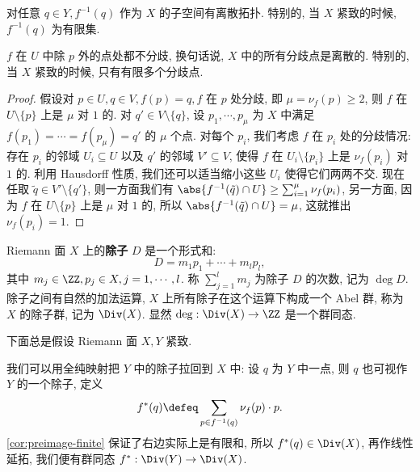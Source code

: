 \begin{cor}
\label{cor:preimage-finite}
对任意 $q \in Y, f^{-1}(q)$ 作为 $X$ 的子空间有离散拓扑.
特别的, 当 $X$ 紧致的时候, $f^{-1}(q)$ 为有限集.
\end{cor}

\begin{prop}
\label{prop:ramification-point-finite}
$f$ 在 $U$ 中除 $p$ 外的点处都不分歧,
换句话说, $X$ 中的所有分歧点是离散的.
特别的, 当 $X$ 紧致的时候, 只有有限多个分歧点.
\end{prop}

\begin{proof}
假设对 $p \in U, q \in V, f(p) = q, f$ 在 $p$ 处分歧,
即 $\mu = \nu_f(p) \ge 2$, 则 $f$ 在 $U\setminus \{p\}$ 上是 $\mu$ 对 $1$ 的.
对 $q' \in V\setminus \{q\}$,
设 $p_1,\cdots, p_\mu$ 为 $X$ 中满足 $f(p_1) = \cdots = f(p_\mu) = q'$ 的 $\mu$ 个点.
对每个 $p_i$, 我们考虑 $f$ 在 $p_i$ 处的分歧情况:
存在 $p_i$ 的邻域 $U_i \subseteq U$ 以及 $q'$ 的邻域 $V' \subseteq V$,
使得 $f$ 在 $U_i\setminus \{p_i\}$ 上是 $\nu_f(p_i)$ 对 $1$ 的.
利用 Hausdorff 性质, 我们还可以适当缩小这些 $U_i$ 使得它们两两不交.
现在任取 $\tilde{q} \in V'\setminus \{q'\}$,
则一方面我们有 $\abs{f^{-1}(\tilde{q})\cap U} \ge \sum_{i=1}^\mu \nu_f(p_i)$,
另一方面, 因为 $f$ 在 $U\setminus \{p\}$ 上是 $\mu$ 对 $1$ 的,
所以 $\abs{f^{-1}(\tilde{q})\cap U} = \mu$,
这就推出 $\nu_f(p_i) = 1$.
\end{proof}

\begin{defin}[除子]
\label{defin:divisor}
Riemann 面 $X$ 上的\textbf{除子} $D$ 是一个形式和:
\[D = m_1p_1 + \cdots + m_lp_l,\]
其中 $m_j \in \ZZ, p_j \in X, j = 1,\cdots, l$.
称 $\sum_{j=1}^l m_j$ 为除子 $D$ 的次数, 记为 $\deg D$.
除子之间有自然的加法运算,
$X$ 上所有除子在这个运算下构成一个 Abel 群,
称为 $X$ 的除子群, 记为 $\Div(X)$.
显然 $\deg: \Div(X) \to \ZZ$ 是一个群同态.
\end{defin}

下面总是假设 Riemann 面 $X, Y$ 紧致.

\begin{exmp}[除子的拉回]
\label{exmp:divisor-pullback}
我们可以用全纯映射把 $Y$ 中的除子拉回到 $X$ 中:
设 $q$ 为 $Y$ 中一点, 则 $q$ 也可视作 $Y$ 的一个除子,
定义
\begin{equation}
\label{eq:divisor-pullback}
f^*(q) \defeq \sum_{p \in f^{-1}(q)}\nu_f(p)\cdot p.
\end{equation}
\cref{cor:preimage-finite} 保证了右边实际上是有限和,
所以 $f^*(q) \in \Div(X)$, 再作线性延拓,
我们便有群同态 $f^*: \Div(Y) \to \Div(X)$.
\end{exmp}


